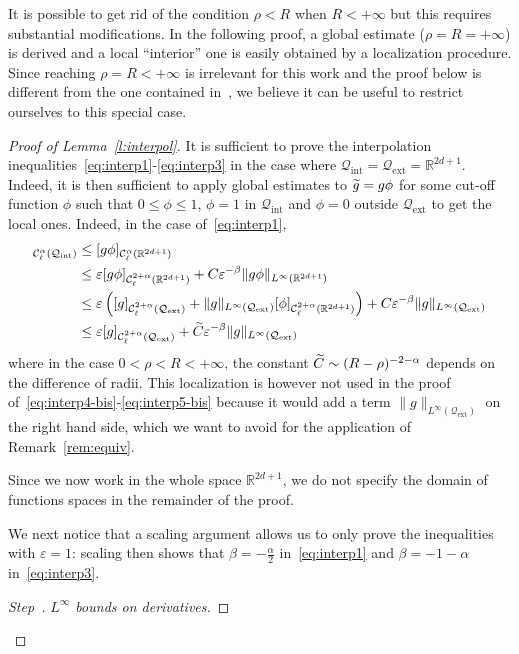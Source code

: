 \documentclass[AHL,Unicode,longabstracts,published]{cedram}
\newcommand{\R}{\mathbb{R}}
\newcommand{\cC}{\mathcal{C}}
\newcommand{\cQ}{\mathcal{Q}}
\newcommand{\Qext}{\cQ_{\mathrm{ext}}}
\newcommand{\Qint}{\cQ_{\mathrm{int}}}
\newcommand*\eps{\varepsilon}
\newcounter{stepcount}
\newenvironment{step}[1]{\refstepcounter{stepcount}\begin{proof}[Step~\thestepcount]{\emph{#1}}}{\let\qed\relax\end{proof}}
\let\oldtilde\tilde
\renewcommand*{\tilde}[1]{\mathchoice{\widetilde{#1}}{\widetilde{#1}}{\oldtilde{#1}}{\oldtilde{#1}}}
\begin{document}
\begin{rema}
It is possible to get rid of the condition $\rho < R$ when $R<+\infty$ but this requires substantial modifications. In the following proof, a global estimate ($\rho=R=+\infty$) is derived and a local ``interior'' one is easily obtained by a localization procedure. Since reaching $\rho =R<+\infty$ is irrelevant for this work and the proof below is different from the one contained in~\cite{imbert2018schauder}, we believe it can be useful to restrict ourselves to this special case.
\end{rema}

\begin{proof}[Proof of Lemma~\ref{l:interpol}]
It is sufficient to prove the interpolation inequalities~\eqref{eq:interp1}-\eqref{eq:interp3} in the case where $\Qint = \Qext = \R^{2d+1}$. Indeed, it is then sufficient to apply global estimates to $\tilde g = g \phi$ for some cut-off function $\phi$ such that $0 \le \phi \le 1$, $\phi =1$ in $\Qint$ and $\phi=0$ outside $\Qext$ to get the local ones. Indeed, in the case of~\eqref{eq:interp1},
\begin{align*}
[g]_{\cC^\alpha_\ell (\Qint)} & \le [g \phi]_{\cC^\alpha_\ell \left(\R^{2d+1}\right)} \\
& \le \eps [g \phi]_{\cC_\ell^{2+\alpha}\left(\R^{2d+1}\right)} + C \eps^{-\beta} \|g \phi\|_{L^\infty\left(\R^{2d+1}\right)} \\
& \le \eps \left([g]_{\cC_\ell^{2+\alpha}(\Qext)} + \|g\|_{L^\infty (\Qext)} [\phi]_{\cC_\ell^{2+\alpha}\left(\R^{2d+1}\right)}\right) + C \eps^{-\beta} \|g\|_{L^\infty (\Qext)} \\
& \le \eps [g]_{\cC_\ell^{2+\alpha}(\Qext)} + \tilde{C} \eps^{-\beta} \|g\|_{L^\infty(\Qext)}
\end{align*}
where in the case $0<\rho<R<+\infty$, the constant $\tilde{C} \sim (R-\rho)^{-2-\alpha}$ depends on the difference of radii. This localization is however not used in the proof of~\eqref{eq:interp4-bis}-\eqref{eq:interp5-bis} because it would add a term $\|g\|_{L^\infty(\Qext)}$ on the right hand side, which we want to avoid for the application of Remark~\ref{rem:equiv}.

Since we now work in the whole space $\R^{2d+1}$, we do not specify the domain of functions spaces in the remainder of the proof.

We next notice that a scaling argument allows us to only prove the inequalities with $\eps =1$: scaling then shows that $\beta = - \frac{\alpha}{2}$ in~\eqref{eq:interp1} and $\beta=-1-\alpha$ in~\eqref{eq:interp3}.
\begin{step}{$L^\infty$ bounds on derivatives\label{step1}.}


\end{step}
\end{proof}
\end{document}
